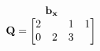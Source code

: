 \documentclass[preview]{standalone}
\begin{document}
\begin{align*}
\begin{array}{ccc}\begin{matrix}\hspace{1cm} \mathbf{b_{x}}  \quad \hspace{0.6cm} \end{matrix} \\ \mathbf{Q} = \begin{bmatrix} 2 & & 1 & 1 \\ 0 & 2 & 3 \end{bmatrix} \end{array}
\end{align*}
\end{document}
